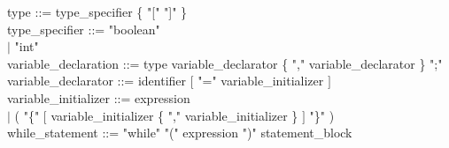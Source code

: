 \documentclass[10pt,a4paper,titlepage]{article}
\begin{document}
\begin{ttfamily}
type ::= type\_specifier \{ "[" "]" \} \\

type\_specifier ::= "boolean" \\
		\hspace*{3.8cm}$\mid$ "int" \\

variable\_declaration ::= type variable\_declarator \{ "," variable\_declarator \} ";" \\

variable\_declarator ::= identifier $[$ "=" variable\_initializer $]$ \\

variable\_initializer ::= expression \\
		\hspace*{4.8cm}$\mid$ ( "\{" $[$ variable\_initializer \{ "," variable\_initializer \} $]$ "\}" ) \\

while\_statement ::= "while" "(" expression ")" statement\_block \\
\end{ttfamily}
\end{document}
